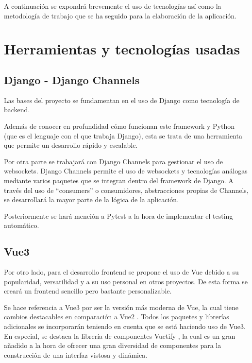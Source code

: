 A continuación se expondrá brevemente el uso de tecnologías así como la metodología
de trabajo que se ha seguido para la elaboración de la aplicación.

\section{Herramientas y tecnologías usadas}

\subsection{Django - Django Channels}

Las bases del proyecto se fundamentan en el uso de Django \cite{django} como tecnología de backend.

Además de conocer en profundidad cómo funcionan este framework y Python (que es el lenguaje con el que trabaja Django),
esta se trata de una herramienta que permite un desarrollo rápido y escalable.

Por otra parte se trabajará con Django Channels \cite{djangoChannels} para gestionar el uso de websockets. Django Channels
permite el uso de websockets y tecnologías análogas mediante varios paquetes que se integran dentro del framework de Django.
A través del uso de ``consumers'' o consumidores, abstracciones propias de Channels, 
se desarrollará la mayor parte de la lógica de la aplicación. 

Posteriormente se hará mención a Pytest \cite{pytest} a la hora de implementar el testing automático.

\subsection{Vue3}

Por otro lado, para el desarrollo frontend se propone el uso de Vue \cite{vue3} debido a su popularidad, versatilidad
y a su uso personal en otros proyectos. De esta forma se creará un frontend sencillo pero bastante personalizable.

Se hace referencia a Vue3 por ser la versión más moderna de Vue, la cual tiene cambios destacables en comparación
a Vue2 \cite{vue3vue2}. Todos los paquetes y librerías adicionales se incorporarán teniendo en cuenta que se está haciendo uso de
Vue3. En especial, se destaca la librería de componentes Vuetify \cite{vuetify}, la cual es un gran añadido a la hora de
ofrecer una gran diversidad de componentes para la construcción de una interfaz vistosa y dinámica.


